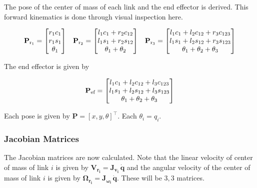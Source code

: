 The pose of the center of mass of each link and the end effector is derived. This forward kinematics is done through visual inspection here.

\begin{align}
    \mathbf{P}_{\textup{r}_1} = \begin{bmatrix}
        r_1 c_1 \\
        r_1 s_1 \\
        \theta_1
        \end{bmatrix}
    &&
    \mathbf{P}_{\textup{r}_2} = \begin{bmatrix}
        l_1 c_1 + r_2 c_{12} \\
        l_1 s_1 + r_2 s_{12} \\
        \theta_1 + \theta_2
        \end{bmatrix}
    &&
    \mathbf{P}_{\textup{r}_3} = \begin{bmatrix}
        l_1 c_1 + l_2 c_{12} + r_3 c_{123} \\
        l_1 s_1 + l_2 s_{12} + r_3 s_{123} \\
        \theta_1 + \theta_2 + \theta_3
        \end{bmatrix}
    \label{eq:3r-fk-com}
\end{align}

The end effector is given by

\begin{align}
    \mathbf{P}_{\textup{ef}} = \begin{bmatrix}
        l_1 c_1 + l_2 c_{12} + l_3 c_{123} \\
        l_1 s_1 + l_2 s_{12} + l_3 s_{123} \\
        \theta_1 + \theta_2 + \theta_3
        \end{bmatrix}
\end{align}

Each pose is given by $\mathbf{P} = [x, y, \theta]^\top$. Each $\theta_i = q_i$.

\subsubsection*{Jacobian Matrices}

The Jacobian matrices are now calculated. Note that the linear velocity of center of mass of link $i$ is given by $\mathbf{V_{r_i}} = \mathbf{J_{v_i} \, \dot{q}}$ and the angular velocity of the center of mass of link $i$ is given by $\mathbf{\Omega_{r_i}} = \mathbf{J_{\omega_i} \, \dot{q}}$. These will be $3, 3$ matrices.

